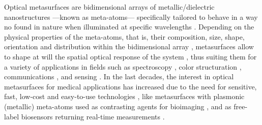 
Optical metasurfaces are bidimensional arrays of metallic/dielectric nanostructures ---known as meta-atoms--- specifically tailored to behave in a way no found in nature when illuminated at specific wavelengths \cite{khan_optical_2022,gonzalez-alcalde_large_2020}. Depending on the physical properties of the meta-atoms, that is, their composition, size, shape, orientation and distribution within the bidimensional array \cite{kim_plasmonic_2019,khan_optical_2022}, metasurfaces allow to shape at will the  spatial optical response of the system \cite{chen_review_2016}, thus suiting them for a variety of applications in fields such as spectroscopy \cite{khan_optical_2022}, color structuration \cite{gonzalez-alcalde_large_2020}, communications \cite{chen_review_2016}, and sensing \cite{estevez_trends_2014,jain_noble_2008,khan_optical_2022,chen_review_2016,kim_plasmonic_2019}. In the last decades, the interest in optical metasurfaces for medical applications has increased due to  the need for sensitive, fast, low-cost and easy-to-use technologies \cite{estevez_trends_2014,kim_plasmonic_2019}, like metasurfaces with plasmonic (metallic) meta-atoms used as contrasting agents for bioimaging  \cite{kim_plasmonic_2019}, and as free-label biosensors returning real-time measurements \cite{estevez_trends_2014,kabashin_plasmonic_2009,khan_optical_2022}.

